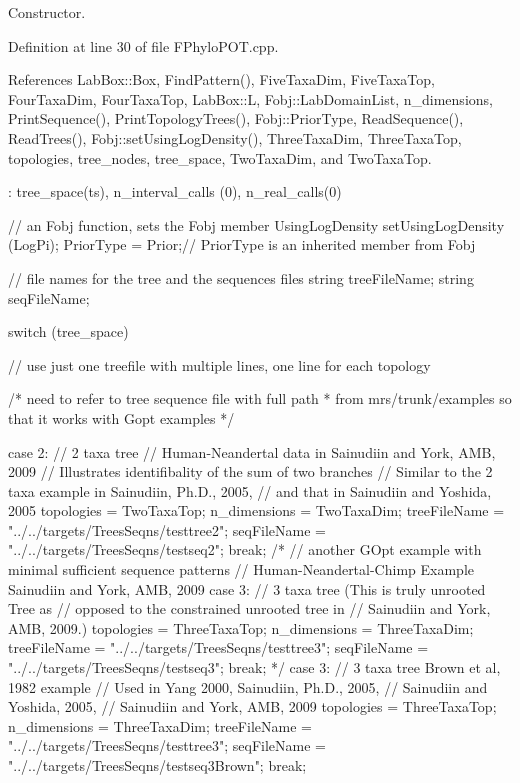\-Constructor. 



\-Definition at line 30 of file \-F\-Phylo\-P\-O\-T.\-cpp.



\-References \-Lab\-Box\-::\-Box, \-Find\-Pattern(), \-Five\-Taxa\-Dim, \-Five\-Taxa\-Top, \-Four\-Taxa\-Dim, \-Four\-Taxa\-Top, \-Lab\-Box\-::\-L, \-Fobj\-::\-Lab\-Domain\-List, n\-\_\-dimensions, \-Print\-Sequence(), \-Print\-Topology\-Trees(), \-Fobj\-::\-Prior\-Type, \-Read\-Sequence(), \-Read\-Trees(), \-Fobj\-::set\-Using\-Log\-Density(), \-Three\-Taxa\-Dim, \-Three\-Taxa\-Top, topologies, tree\-\_\-nodes, tree\-\_\-space, \-Two\-Taxa\-Dim, and \-Two\-Taxa\-Top.


\begin{DoxyCode}
                                                                  :
tree_space(ts), n_interval_calls (0), n_real_calls(0)
{
  // an Fobj function, sets the Fobj member UsingLogDensity
  setUsingLogDensity (LogPi);
  PriorType = Prior;// PriorType is an inherited member from Fobj

  // file names for the tree and the sequences files
  string treeFileName;
  string seqFileName;

  switch (tree_space)
  {

    // use just one treefile with multiple lines, one line for each topology

    /* need to refer to tree sequence file with full path
     * from mrs/trunk/examples so that it works with Gopt examples
     */

    case 2:         // 2 taxa tree
                    // Human-Neandertal data in Sainudiin and York, AMB, 2009
                    // Illustrates identifibality of the sum of two branches
                    // Similar to the 2 taxa example in Sainudiin, Ph.D., 2005,
                    // and that in Sainudiin and Yoshida, 2005
      topologies = TwoTaxaTop;
      n_dimensions = TwoTaxaDim;
      treeFileName = "../../targets/TreesSeqns/testtree2";
      seqFileName = "../../targets/TreesSeqns/testseq2";
      break;
      /*
      // another GOpt example with minimal sufficient sequence patterns
      // Human-Neandertal-Chimp Example Sainudiin and York, AMB, 2009
    case 3:         // 3 taxa tree (This is truly unrooted Tree as 
                    // opposed to the constrained unrooted tree in
                    // Sainudiin and York, AMB, 2009.)
      topologies = ThreeTaxaTop;
      n_dimensions = ThreeTaxaDim;
      treeFileName = "../../targets/TreesSeqns/testtree3";
      seqFileName = "../../targets/TreesSeqns/testseq3";
      break;
      */
    case 3: // 3 taxa tree Brown et al, 1982 example
            // Used in Yang 2000, Sainudiin, Ph.D., 2005, 
            // Sainudiin and Yoshida, 2005,
            // Sainudiin and York, AMB, 2009
      topologies = ThreeTaxaTop;
      n_dimensions = ThreeTaxaDim;
      treeFileName = "../../targets/TreesSeqns/testtree3";
      seqFileName = "../../targets/TreesSeqns/testseq3Brown"; 
      break;
      
}}
\end{DoxyCode}
